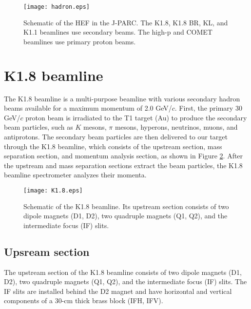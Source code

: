 \begin{figure}[!h]
 \begin{center}
   \texttt{[image: hadron.eps]}
   \caption{Schematic of the HEF in the J-PARC. The K1.8, K1.8 BR, KL, and K1.1 beamlines use secondary beams. The high-p and COMET beamlines use primary proton beams.}
   \label{fig-hadron}
 \end{center}
\end{figure}

\clearpage 
\section{K1.8 beamline}
\label{sec-k18beamline}

The K1.8 beamline is a multi-purpose beamline with various secondary hadron beams available for a maximum momentum of 2.0 GeV/$c$. First, the primary 30 GeV/$c$ proton beam is irradiated to the T1 target (Au) to produce the secondary beam particles, such as $K$ mesons, $\pi$ mesons, hyperons, neutrinos, muons, and antiprotons. The secondary beam particles are then delivered to our target through the K1.8 beamline, which consists of the upstream section, mass separation section, and momentum analysis section, as shown in Figure \ref{fig-K1.8}. After the upstream and mass separation sections extract the beam particles, the K1.8 beamline spectrometer analyzes their momenta. 

\begin{figure}[!h]
 \begin{center}
   \texttt{[image: K1.8.eps]}
   \caption{Schematic of the K1.8 beamline. Its upstream section consists of two dipole magnets (D1, D2), two quadruple magnets (Q1, Q2), and the intermediate focus (IF) slits.}
   \label{fig-K1.8}
 \end{center}
\end{figure}

\subsection{Upsream section}
The upstream section of the K1.8 beamline consists of two dipole magnets (D1, D2), two quadruple magnets (Q1, Q2), and the intermediate focus (IF) slits. The IF slits are installed behind the D2 magnet and have horizontal and vertical components of a 30-cm thick brass block (IFH, IFV).

